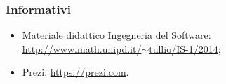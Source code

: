 \subsubsection{Informativi}
\begin{itemize}
	\item Materiale didattico Ingegneria del Software: \\
	\href{http://www.math.unipd.it/~tullio/IS-1/2014}{http://www.math.unipd.it/$\sim$tullio/IS-1/2014};
	
	\item Prezi:
	\href{https://prezi.com}{https://prezi.com}.
\end{itemize}